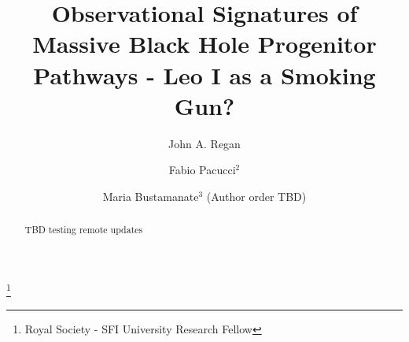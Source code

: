 \documentclass[twocolumn, tighten]{aastex631}
\begin{document}
\title[Leo I a fossil galaxy]{Observational Signatures of Massive Black Hole Progenitor Pathways - Leo I as a Smoking Gun?}

\author[0000-0001-9072-6427]{John A. Regan}
\thanks{Royal Society - SFI University Research Fellow}

\author{Fabio Pacucci$^{2}$}
\author{Maria Bustamanate$^{3}$ (Author order TBD)}





\begin{abstract}
 TBD testing remote updates
\end{abstract}

\end{document}
